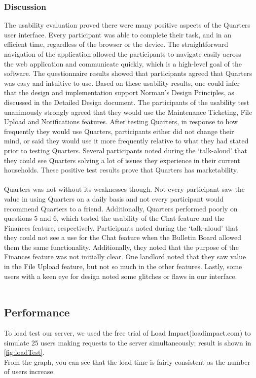 \documentclass[12pt]{article}
\begin{document}
\subsubsection{Discussion}
The usability evaluation proved there were many positive aspects of the Quarters user interface. Every participant was able to complete their task, and in an efficient time, regardless of the browser or the device. The straightforward navigation of the application allowed the participants to navigate easily across the web application and communicate quickly, which is a high-level goal of the software. The questionnaire results showed that participants agreed that Quarters was easy and intuitive to use. Based on these usability results, one could infer that the design and implementation support Norman’s Design Principles, as discussed in the Detailed Design document. The participants of the usability test unanimously strongly agreed that they would use the Maintenance Ticketing, File Upload and Notifications features. After testing Quarters, in response to how frequently they would use Quarters, participants either did not change their mind, or said they would use it more frequently relative to what they had stated prior to testing Quarters. Several participants noted during the ‘talk-aloud’ that they could see Quarters solving a lot of issues they experience in their current households. These positive test results prove that Quarters has marketability. \\ \\
Quarters was not without its weaknesses though. Not every participant saw the value in using Quarters on a daily basis and not every participant would recommend Quarters to a friend. Additionally, Quarters performed poorly on questions 5 and 6, which tested the usability of the Chat feature and the Finances feature, respectively. Participants noted during the ‘talk-aloud’ that they could not see a use for the Chat feature when the Bulletin Board allowed them the same functionality. Additionally, they noted that the purpose of the Finances feature was not initially clear. One landlord noted that they saw value in the File Upload feature, but not so much in the other features. Lastly, some users with a keen eye for design noted some glitches or flaws in our interface. \\ \\
 



\subsection{Performance}
To load test our server, we used the free trial of Load Impact(loadimpact.com) to simulate 25 users making requests to the server simultaneously; result is shown in \ref{fig:loadTest}.
\\From the graph, you can see that the load time is fairly consistent as the number of users increase.
\end{document}
